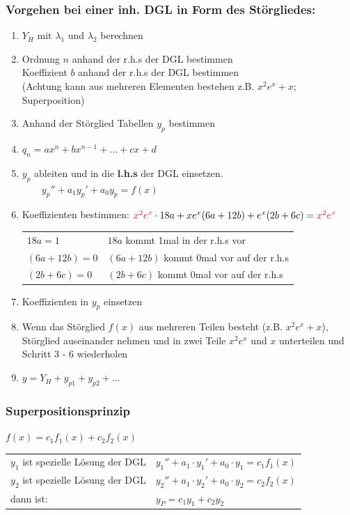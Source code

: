 \subsubsection{Vorgehen bei einer inh. DGL in Form des Störgliedes: }
	\begin{enumerate}
		\item 	$Y_H$ mit $\lambda_1$ und $\lambda_2$ berechnen
		\item 	Ordnung $n$ anhand der r.h.s der DGL bestimmen\\
			Koeffizient $b$ anhand der r.h.s der DGL bestimmen\\
			(Achtung kann aus mehreren Elementen bestehen z.B. $x^2e^x + x$; Superposition)
		\item 	Anhand der Störglied Tabellen $y_p$ bestimmen
		\item 	$q_n = ax^n + bx^{n-1} + \dots + cx + d$
		\item 	$y_p$ ableiten und in die \textbf{ l.h.s} der DGL einsetzen. $\qquad y_p'' + a_1 y_p' + a_0y_p = f(x)$
		\item 	Koeffizienten bestimmen: $\textcolor{red}{x^2e^x}\cdot 18a + xe^x(6a + 12b) + e^x(2b + 6c) = \textcolor{red}{x^2e^x}$\\
			\begin{tabular}{ll}
				$18a = 1$ & $18a$ kommt 1mal in der r.h.s vor\\
				$(6a + 12b) = 0$ & $(6a + 12b)$ kommt 0mal vor auf der r.h.s\\
				$(2b + 6c) = 0$ & $(2b + 6c)$ kommt 0mal vor auf der r.h.s
			\end{tabular}
		\item 	Koeffizienten in $y_p$ einsetzen
		\item 	Wenn das Störglied $f(x)$ aus mehreren Teilen besteht (z.B. $x^2e^x + x$), Störglied auseinander nehmen und in zwei Teile $x^2e^x$ und $x$ unterteilen und Schritt 3 - 6 wiederholen
		\item 	$y = Y_H + y_{p1} + y_{p2} + \dots$

	\end{enumerate}


\subsubsection{Superpositionsprinzip}
$f(x)=c_1f_1(x)+c_2f_2(x)$\\
\begin{tabular}{p{8cm}p{8cm}}
$y_1$ ist spezielle Lösung der DGL &
$y_1''+a_1\cdot y_1'+a_0\cdot y_1=c_1f_1(x)$ \\
$y_2$ ist spezielle Lösung der DGL &
$y_2''+a_1\cdot y_2'+a_0\cdot y_2=c_2f_2(x)$ \\
dann ist:                          &
$y_P=c_1y_1+c_2y_2$\\
\end{tabular}

